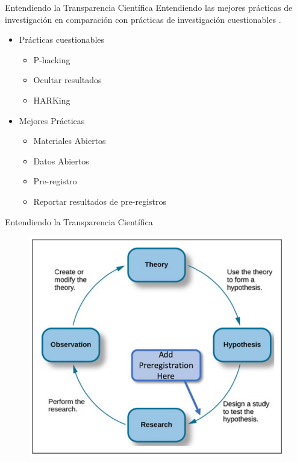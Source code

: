 \documentclass{beamer}
\begin{document}
\begin{frame}{Entendiendo la Transparencia Científica}
Entendiendo las mejores prácticas de investigación en comparación con prácticas de investigación cuestionables \cite{Morling2020}.
\\
\vspace{0.5cm}
\begin{itemize}
    \item Prácticas cuestionables
    \begin{itemize}
        \item P-hacking
        \item Ocultar resultados 
        \item HARKing
    \end{itemize}
    \item Mejores Prácticas 
    \begin{itemize}
        \item Materiales Abiertos
        \item Datos Abiertos
        \item Pre-registro
        \item Reportar resultados de pre-registros
    \end{itemize}
\end{itemize}
\end{frame}

\begin{frame}{Entendiendo la Transparencia Científica}
\begin{figure}
\includegraphics[width=.6\textwidth]{RC.png}
\end{figure}
\end{frame}
\end{document}
